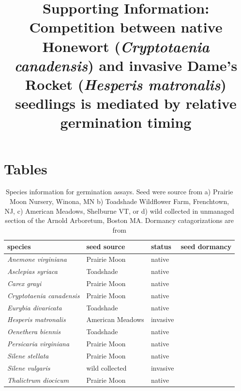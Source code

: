 \documentclass{article}\usepackage[]{graphicx}\usepackage[]{color}
\title{Supporting Information: Competition between native Honewort (\textit{Cryptotaenia canadensis}) and invasive Dame's Rocket (\textit{Hesperis matronalis}) seedlings is mediated by relative germination timing}
\date{}
\begin{document}
\maketitle

\section*{Tables}
\begin{table}[ht]
\centering
\begin{tabular}{|l|l|l|l|}
\hline
species & seed source & status & seed dormancy \\
\hline
\textit{Anemone virginiana} & Prairie Moon & native & \\
\textit{Asclepias syriaca} & Toadshade & native & \\
\textit{Carex grayi} & Prairie Moon & native & \\
\textit{Cryptotaenia canadensis} & Prairie Moon & native & \\
\textit{Eurybia divaricata} & Toadshade & native & \\
\textit{Hesperis matronalis} & American Meadows & invasive & \\
\textit{Oenethera biennis} & Toadshade & native & \\
\textit{Persicaria virginiana} & Prairie Moon & native & \\
\textit{Silene stellata} & Prairie Moon & native & \\
\textit{Silene vulgaris} & wild collected & invasive & \\
\textit{Thalictrum diocicum} & Prairie Moon & native & \\
\hline

\end{tabular}
\caption{Species information for germination assays. Seed were source from a) Prairie Moon Nursery, Winona, MN b) Toadshade Wildflower Farm, Frenchtown, NJ, c) American Meadows, Shelburne VT, or d) wild collected in unmanaged section of the Arnold Arboretum, Boston MA. Dormancy catagorizations are from \citet{Baskin2015} }
\label{tab:specs}
\end{table}
\end{document}

